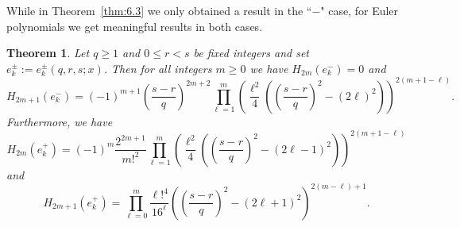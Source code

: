 \documentclass{amsart}
\theoremstyle{plain}
\newtheorem{theorem}{Theorem}[section]
\numberwithin{equation}{section}
\begin{document}
While in Theorem~\ref{thm:6.3} we only obtained a result in the ``$-$" case,
for Euler polynomials we get meaningful results in both cases.

\begin{theorem}\label{thm:4.3}
Let $q\geq 1$ and $0\leq r<s$ be fixed integers and set
$e_k^{\pm}:=e_k^{\pm}(q,r,s;x)$. Then for all integers $m\geq 0$ we have
$H_{2m}(e_k^{-})=0$ and
\begin{equation}\label{4.4}
H_{2m+1}(e_k^{-})=(-1)^{m+1}\left(\frac{s-r}{q}\right)^{2m+2}\prod_{\ell=1}^m
\left(\frac{\ell^2}{4}\left(\left(\frac{s-r}{q}\right)^2-(2\ell)^2\right)\right)^{2(m+1-\ell)}.
\end{equation}
Furthermore, we have
\begin{equation}\label{4.5}
H_{2m}(e_k^{+})=(-1)^{m}\frac{2^{2m+1}}{m!^2}\prod_{\ell=1}^m
\left(\frac{\ell^2}{4}\left(\left(\frac{s-r}{q}\right)^2-(2\ell-1)^2\right)\right)^{2(m+1-\ell)}
\end{equation}
and
\begin{equation}\label{4.6}
H_{2m+1}(e_k^{+})=\prod_{\ell=0}^m\frac{\ell!^4}{16^\ell}
\left(\left(\frac{s-r}{q}\right)^2-(2\ell+1)^2\right)^{2(m-\ell)+1}. 
\end{equation}
\end{theorem}
\end{document}
